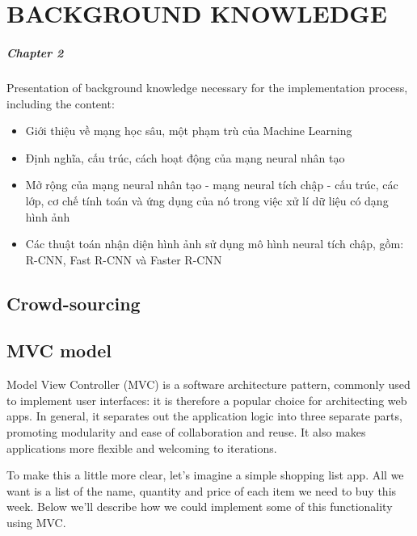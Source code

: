 \chapter{BACKGROUND KNOWLEDGE}
\label{chap:background}
\paragraph{Chapter 2} Presentation of background knowledge necessary for the implementation process, including the content:

\begin{itemize}
\item Giới thiệu về mạng học sâu, một phạm trù của Machine Learning

\item Định nghĩa, cấu trúc, cách hoạt động của mạng neural nhân tạo

\item Mở rộng của mạng neural nhân tạo - mạng neural tích chập - cấu trúc, các lớp, cơ chế tính toán và ứng dụng của nó trong việc xử lí dữ liệu có dạng hình ảnh

\item Các thuật toán nhận diện hình ảnh sử dụng mô hình neural tích chập, gồm: R-CNN, Fast R-CNN và Faster R-CNN
\end{itemize}

\section{Crowd-sourcing}

\section{MVC model}
Model View Controller (MVC) is a software architecture pattern, commonly used to implement user interfaces: it is therefore a popular choice for architecting web apps. In general, it separates out the application logic into three separate parts, promoting modularity and ease of collaboration and reuse. It also makes applications more flexible and welcoming to iterations.

To make this a little more clear, let's imagine a simple shopping list app. All we want is a list of the name, quantity and price of each item we need to buy this week. Below we'll describe how we could implement some of this functionality using MVC.

